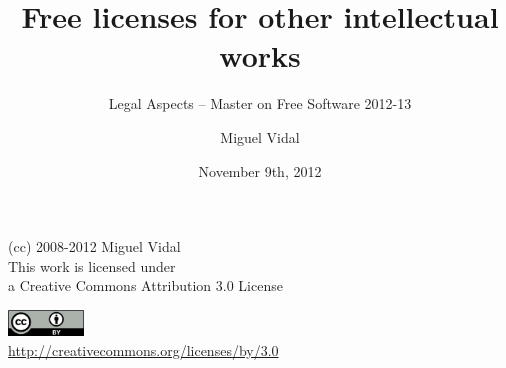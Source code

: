 \documentclass{beamer}
\begin{document}
\title{Free licenses for other intellectual works}
\subtitle{Legal Aspects -- Master on Free Software 2012-13}
\author{Miguel Vidal} 
\date{November 9th, 2012}



\begin{frame}
  \vspace{2cm}
  \begin{flushright}
    {\small (cc) 2008-2012 Miguel Vidal} \\
    \medskip
    {\scriptsize This work is licensed under \\ a Creative Commons Attribution 3.0 License}
  \end{flushright}
  \begin{flushright}
    \href{http://creativecommons.org/licenses/by/3.0}{\includegraphics[width=2cm]{format/cc-by.png}} \\
    {\tiny \url{http://creativecommons.org/licenses/by/3.0}}
  \end{flushright}
\end{frame}%

\usebackgroundtemplate{}

\end{document}
